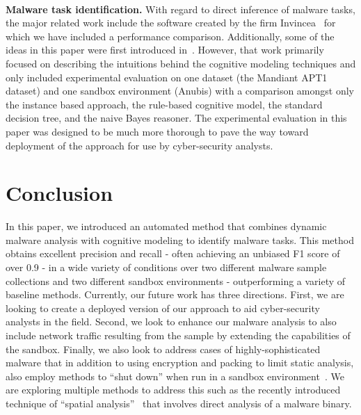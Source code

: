 \documentclass[conference]{IEEEtran}
\begin{document}
\smallskip\\
\noindent\textbf{Malware task identification.}  With regard to direct inference of malware tasks, the major related work include the software created by the firm Invincea~\cite{invencia} for which we have included a performance comparison.  Additionally, some of the ideas in this paper were first introduced in~\cite{iccm:2015,brims}.  However, that work primarily focused on describing the intuitions behind the cognitive modeling techniques and only included experimental evaluation on one dataset (the Mandiant APT1 dataset) and one sandbox environment (Anubis) with a comparison amongst only the instance based approach, the rule-based cognitive model, the standard decision tree, and the naive Bayes reasoner.  The experimental evaluation in this paper was designed to be much more thorough to pave the way toward deployment of the approach for use by cyber-security analysts.

\section{Conclusion}
\label{con}
In this paper, we introduced an automated method that combines dynamic malware analysis with cognitive modeling to identify malware tasks.  This method obtains excellent precision and recall - often achieving an unbiased F1 score of over 0.9 - in a wide variety of conditions over two different malware sample collections and two different sandbox environments - outperforming a variety of baseline methods.
Currently, our future work has three directions.  First, we are looking to create a deployed version of our approach to aid cyber-security analysts in the field.  Second, we look to enhance our malware analysis to also include network traffic resulting from the sample by extending the capabilities of the sandbox.  Finally, we also look to address cases of highly-sophisticated malware that in addition to using encryption and packing to limit static analysis, also employ methods to ``shut down'' when run in a sandbox environment~\cite{Lindorfer:2011}.  We are exploring multiple methods to address this such as the recently introduced technique of ``spatial analysis''~\cite{sentar} that involves direct analysis of a malware binary. 






\end{document}

